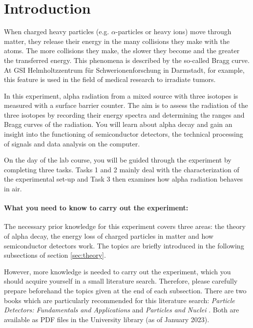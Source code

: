 \section{Introduction}
When charged heavy particles (e.g. $\alpha$-particles or heavy ions) move through matter, they release their energy in the many collisions they make with the atoms. The more collisions they make, the slower they become and the greater the transferred energy. This phenomena is described by the so-called Bragg curve. At GSI Helmholtzzentrum für Schwerionenforschung in Darmstadt, for example, this feature is used in the field of medical research to irradiate tumors.

In this experiment, alpha radiation from a mixed source with three isotopes is measured with a surface barrier counter. The aim is to assess the radiation of the three isotopes by recording their energy spectra and determining the ranges and Bragg curves of the radiation. You will learn about alpha decay and gain an insight into the functioning of semiconductor detectors, the technical processing of signals and data analysis on the computer.

On the day of the lab course, you will be guided through the experiment by completing three tasks. Tasks 1 and 2 mainly deal with the characterization of the experimental set-up and Task 3 then examines how alpha radiation behaves in air.

\paragraph*{What you need to know to carry out the experiment:}
The necessary prior knowledge for this experiment covers three areas: the theory of alpha decay, the energy loss of charged particles in matter and how semiconductor detectors work. The topics are briefly introduced in the following subsections of section \ref{sec:theory}.

However, more knowledge is needed to carry out the experiment, which you should acquire yourself in a small literature search. Therefore, please carefully prepare beforehand the topics given at the end of each subsection. There are two books which are particularly recommended for this literature search: \textit{Particle Detectors: Fundamentals and Applications} \cite{kolanoski} and \textit{Particles and Nuclei} \cite{povh-rith}. Both are available as PDF files in the University library (as of January 2023).


